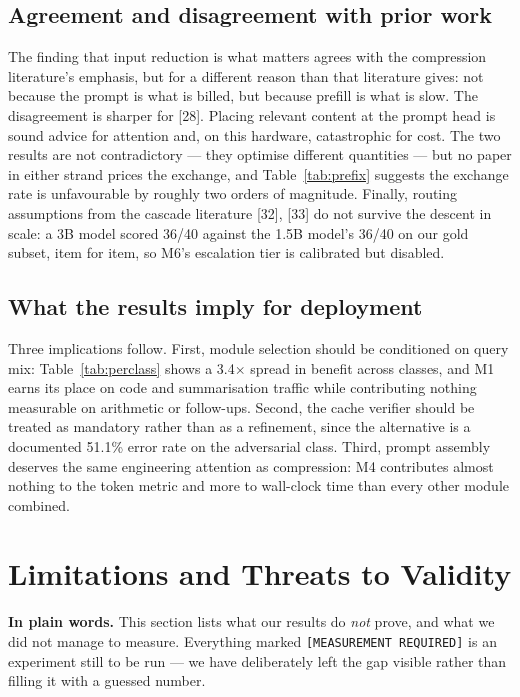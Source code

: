 \documentclass[11pt,a4paper]{article}
\newcommand{\plain}[1]{%
  \par\vspace{1pt}
  \noindent\begin{tcolorbox}[colback=plainblue,colframe=plainrule,boxrule=0pt,
    leftrule=2.2pt,arc=0pt,left=7pt,right=5pt,top=4pt,bottom=4pt,breakable]
  \small\textbf{In plain words.} #1
  \end{tcolorbox}\par\vspace{2pt}}
\begin{document}
\subsection{Agreement and disagreement with prior work}
The finding that input reduction is what matters agrees with the compression
literature's emphasis, but for a different reason than that literature gives:
not because the prompt is what is billed, but because prefill is what is slow.
The disagreement is sharper for [28]. Placing relevant content at the prompt head
is sound advice for attention and, on this hardware, catastrophic for cost. The
two results are not contradictory --- they optimise different quantities --- but no
paper in either strand prices the exchange, and Table~\ref{tab:prefix} suggests
the exchange rate is unfavourable by roughly two orders of magnitude. Finally,
routing assumptions from the cascade literature [32], [33] do not survive the
descent in scale: a 3B model scored 36/40 against the 1.5B model's 36/40 on our
gold subset, item for item, so M6's escalation tier is calibrated but disabled.

\subsection{What the results imply for deployment}
Three implications follow. First, module selection should be conditioned on query
mix: Table~\ref{tab:perclass} shows a 3.4$\times$ spread in benefit across
classes, and M1 earns its place on code and summarisation traffic while
contributing nothing measurable on arithmetic or follow-ups. Second,
the cache verifier should be treated as mandatory rather than as a refinement,
since the alternative is a documented 51.1\% error rate on the adversarial class.
Third, prompt assembly deserves the same engineering attention as compression:
M4 contributes almost nothing to the token metric and more to wall-clock time than
every other module combined.

\section{Limitations and Threats to Validity}
\label{sec:limits}

\plain{This section lists what our results do \emph{not} prove, and what we did
not manage to measure. Everything marked \texttt{[MEASUREMENT REQUIRED]} is an
experiment still to be run --- we have deliberately left the gap visible rather
than filling it with a guessed number.}
\end{document}
